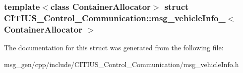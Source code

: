 \subsubsection*{template$<$class Container\-Allocator$>$ struct C\-I\-T\-I\-U\-S\-\_\-\-Control\-\_\-\-Communication\-::msg\-\_\-vehicle\-Info\-\_\-$<$ Container\-Allocator $>$}



\-The documentation for this struct was generated from the following file\-:\begin{DoxyCompactItemize}
\item 
msg\-\_\-gen/cpp/include/\-C\-I\-T\-I\-U\-S\-\_\-\-Control\-\_\-\-Communication/msg\-\_\-vehicle\-Info.\-h\end{DoxyCompactItemize}
